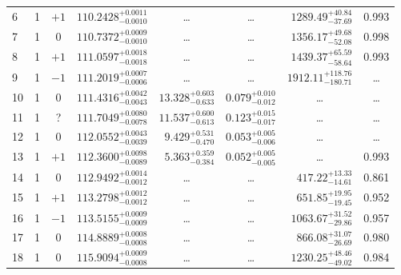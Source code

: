 \begin{table*}[!]
\begin{tabular}{llcrrlrc}
6 & 1 & $+1$ & $    110.2428_{-      0.0010}^{+      0.0011}$ & \multicolumn{1}{c}{\dots} & \multicolumn{1}{c}{\dots} & $     1289.49_{-       37.69}^{+       40.84}$ & 0.993\\[1pt]
7 & 1 & 0 & $    110.7372_{-      0.0010}^{+      0.0009}$ & \multicolumn{1}{c}{\dots} & \multicolumn{1}{c}{\dots} & $     1356.17_{-       52.08}^{+       49.68}$ & 0.998\\[1pt]
8 & 1 & $+1$ & $    111.0597_{-      0.0018}^{+      0.0018}$ & \multicolumn{1}{c}{\dots} & \multicolumn{1}{c}{\dots} & $     1439.37_{-       58.64}^{+       65.59}$ & 0.993\\[1pt]
9 & 1 & $-1$ & $    111.2019_{-      0.0006}^{+      0.0007}$ & \multicolumn{1}{c}{\dots} & \multicolumn{1}{c}{\dots} & $     1912.11_{-      180.71}^{+      118.76}$ & \dots \\[1pt]
10 & 1 & 0 & $    111.4316_{-      0.0043}^{+      0.0042}$ & $      13.328_{-       0.633}^{+       0.603}$ & $       0.079_{-       0.012}^{+       0.010}$ & \multicolumn{1}{c}{\dots} & \dots \\[1pt]
11 & 1 & ? & $    111.7049_{-      0.0078}^{+      0.0080}$ & $      11.537_{-       0.613}^{+       0.600}$ & $       0.123_{-       0.017}^{+       0.015}$ & \multicolumn{1}{c}{\dots} & \dots \\[1pt]
12 & 1 & 0 & $    112.0552_{-      0.0039}^{+      0.0043}$ & $       9.429_{-       0.470}^{+       0.531}$ & $       0.053_{-       0.006}^{+       0.005}$ & \multicolumn{1}{c}{\dots} & \dots \\[1pt]
13 & 1 & $+1$ & $    112.3600_{-      0.0089}^{+      0.0098}$ & $       5.363_{-       0.384}^{+       0.359}$ & $       0.052_{-       0.005}^{+       0.005}$ & \multicolumn{1}{c}{\dots} & 0.993\\[1pt] 
14 & 1 & 0 & $    112.9492_{-      0.0012}^{+      0.0014}$ & \multicolumn{1}{c}{\dots} & \multicolumn{1}{c}{\dots} & $      417.22_{-       14.61}^{+       13.33}$ & 0.861\\[1pt]
15 & 1 & $+1$ & $    113.2798_{-      0.0012}^{+      0.0012}$ & \multicolumn{1}{c}{\dots} & \multicolumn{1}{c}{\dots} & $      651.85_{-       19.45}^{+       19.95}$ & 0.952\\[1pt]
16 & 1 & $-1$ & $    113.5155_{-      0.0009}^{+      0.0009}$ & \multicolumn{1}{c}{\dots} & \multicolumn{1}{c}{\dots} & $     1063.67_{-       29.86}^{+       31.52}$ & 0.957\\[1pt]
17 & 1 & 0 & $    114.8889_{-      0.0008}^{+      0.0008}$ & \multicolumn{1}{c}{\dots} & \multicolumn{1}{c}{\dots} & $      866.08_{-       26.69}^{+       31.07}$ & 0.980\\[1pt]
18 & 1 & 0 & $    115.9094_{-      0.0008}^{+      0.0009}$ & \multicolumn{1}{c}{\dots} & \multicolumn{1}{c}{\dots} & $     1230.25_{-       49.02}^{+       48.46}$ & 0.984\\[1pt]


\end{tabular}
\end{table*}
